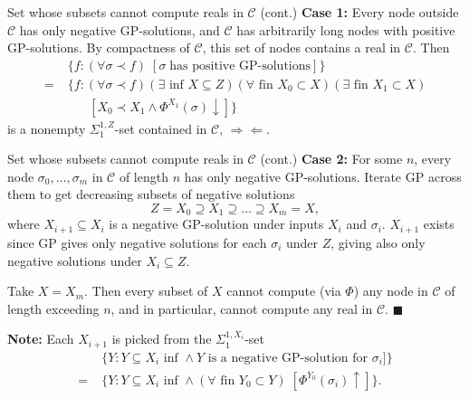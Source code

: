 \begin{frame}{Set whose subsets cannot compute reals in $\mathcal{C}$
(cont.)}
  \textbf{Case 1:} Every node outside $\mathcal{C}$ has only negative
  GP-solutions, and $\mathcal{C}$ has arbitrarily long nodes with
  positive GP-solutions. By compactness of $\mathcal{C}$, this set of
  nodes contains a real in $\mathcal{C}$. Then
  \begin{align*}
    &\{f:(\forall \sigma\prec f)\; [\sigma\; \text{has
    positive GP-solutions}]\}\\
    =\;&\{f:(\forall \sigma\prec f) (\exists \text{ inf } X\subseteq
    Z) (\forall \text{ fin } X_0\subset X) (\exists \text{ fin }
    X_1\subset X)\\
    &\;\;\;\;\;\;[X_0 \prec X_1 \wedge \Phi^{X_1}(\sigma)\downarrow]\}
  \end{align*}
  is a nonempty $\Sigma_1^{1,Z}$-set contained
  in $\mathcal{C}$, $\Rightarrow\Leftarrow$.
\end{frame}

\begin{frame}{Set whose subsets cannot compute reals in $\mathcal{C}$
(cont.)}
  \textbf{Case 2:} For some $n$, every node $\sigma_0,\ldots,\sigma_m$ in
  $\mathcal{C}$ of length $n$ has only negative GP-solutions. Iterate GP
  across them to get decreasing subsets of negative solutions
  \[Z=X_0 \supseteq X_1 \supseteq \ldots\supseteq X_m=X,\]
  where $X_{i+1}\subseteq X_i$ is a negative GP-solution under inputs
  $X_i$ and $\sigma_i$. $X_{i+1}$ exists since GP gives only negative
  solutions for each $\sigma_i$ under $Z$, giving also only negative
  solutions under $X_i\subseteq Z$.

  \vspace{0.5em}
  Take $X=X_m$. Then every subset of $X$ cannot compute (via $\Phi$) any
  node in $\mathcal{C}$ of length exceeding $n$, and in particular,
  cannot compute any real in $\mathcal{C}$. $\blacksquare$

  \vspace{0.5em}
  \textbf{Note:} Each $X_{i+1}$ is picked from the $\Sigma^{1,X_i}_1$-set
  \begin{align*}
    &\{Y:Y\subseteq X_i \text{ inf } \wedge Y \text{ is a
    negative GP-solution for } \sigma_i]\}\\
    =\;&\{Y:Y\subseteq X_i \text{ inf } \wedge (\forall \text{ fin }
    Y_0\subset Y)\; [\Phi^{Y_0}(\sigma_i)\uparrow]\}.
  \end{align*}
\end{frame}

